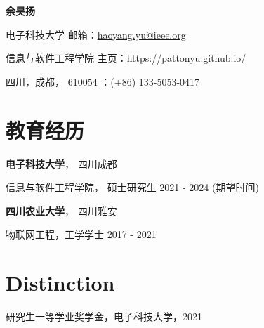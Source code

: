 \documentclass{article}
\begin{document}
\begin{center}
    \vspace*{5pt}
    \Huge{
    \textbf{余昊扬}}
\end{center}
\vspace{15pt}


\setlength{\parskip}{1pt}

\noindent 电子科技大学 \hfill 邮箱：\href{haoyang.yu@ieee.org}{haoyang.yu@ieee.org}

\noindent 信息与软件工程学院 \hfill 主页：\url{https://pattonyu.github.io/}

\noindent 四川，成都， 610054 ：(+86) 133-5053-0417

\setlength{\parskip}{3pt}






\section*{教育经历}
\indent 
\textbf{电子科技大学}， 四川成都

\hspace{2em}信息与软件工程学院， 硕士研究生 2021 - 2024 (期望时间)

\textbf{四川农业大学}， 四川雅安

\hspace{2em}物联网工程，工学学士 2017 - 2021









\section*{Distinction}
\indent
研究生一等学业奖学金，电子科技大学，2021
\end{document}
